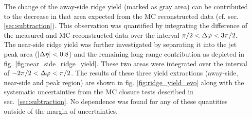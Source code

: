The change of the \gls{away-side} ridge yield (marked as gray area) can be contributed to the decrease in that area expected from the MC reconstructed data (cf. sec. \ref{sec:subtraction}). This observation was quantified by integrating the difference of the measured and MC reconstructed data over the interval  $\pi / 2 < \Delta\varphi < 3\pi/2$. The \gls{near-side} ridge yield was further investigated by separating it into the jet peak area ($|\Delta\eta| < 0.8$) and the remaining long range contribution as depicted in fig. \ref{fig:near_side_ridge_yield}. These two areas were integrated over the interval of $-2\pi /2 < \Delta\varphi < \pi /2$. The results of these three yield extractions (away-side, near-side and peak region) are shown in fig. \ref{fig:ridge_yield_evo} along with the systematic uncertainties from the MC closure tests described in sec.~\ref{sec:subtraction}. No \ptthresh dependence was found for any of these quantities outside of the margin of uncertainties.


